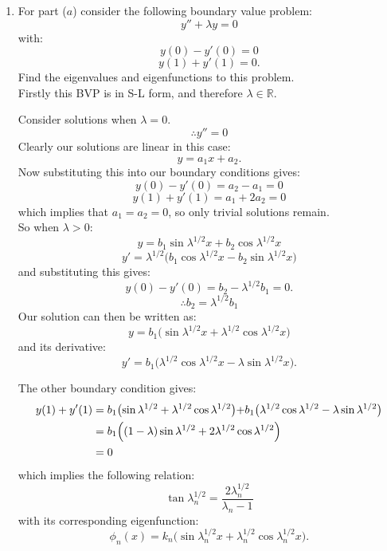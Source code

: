 \pagestyle{fancy}
\fancyhead{}

\begin{enumerate}
    \item For part ($a$) consider the following boundary value problem:
    $$y''+\lambda y=0$$
    with:
    $$y(0)-y'(0)=0$$
    $$y(1)+y'(1)=0.$$
    Find the eigenvalues and eigenfunctions to this problem. \\

    Firstly this BVP is in S-L form, and therefore
    $\lambda\in\mathbb{R}$.

    Consider solutions when $\lambda=0$.
    $$\therefore y''=0$$
    Clearly our solutions are linear in this case:
    $$y=a_1 x+a_2.$$
    Now substituting this into our boundary conditions gives:
    $$y(0)-y'(0)=a_2-a_1=0$$
    $$y(1)+y'(1)=a_1+2a_2=0$$
    which implies that $a_1=a_2=0$, so only trivial solutions remain. \\

    So when $\lambda>0$:
    $$y=b_1\sin\lambda^{1/2}x+b_2\cos\lambda^{1/2}x$$
    $$y'=\lambda^{1/2}\bigl(b_1\cos\lambda^{1/2}x-b_2\sin\lambda^{1/2}x\bigl)$$
    and substituting this gives:
    $$y(0)-y'(0)=b_2-\lambda^{1/2}b_1=0.$$
    $$\therefore b_2=\lambda^{1/2}b_1$$
    Our solution can then be written as:
    $$y=b_1\bigl(\sin\lambda^{1/2}x+\lambda^{1/2}\cos\lambda^{1/2}x\bigl)$$
    and its derivative:
    $$y'=b_1\bigl(\lambda^{1/2}\cos\lambda^{1/2}x-\lambda\sin\lambda^{1/2}x\bigl).$$

    \newpage

    The other boundary condition gives:
    \begin{align*}
        y(1)+y'(1)
        &=b_1\bigl(\sin\lambda^{1/2}+\lambda^{1/2}\cos\lambda^{1/2}\bigl)
        +b_1\bigl(\lambda^{1/2}\cos\lambda^{1/2}-\lambda\sin\lambda^{1/2}\bigr) \\
        &=b_1\Bigl((1-\lambda)\sin\lambda^{1/2}+2\lambda^{1/2}\cos\lambda^{1/2}\Bigr) \\
        &=0
    \end{align*}
    which implies the following relation:
    $$\tan\lambda_n^{1/2}=\frac{2\lambda_n^{1/2}}{\lambda_n-1}$$
    with its corresponding eigenfunction:
    $$\phi_n(x)=k_n\bigl(\sin\lambda_n^{1/2}x+\lambda_n^{1/2}\cos\lambda_n^{1/2}x\bigr).$$ \\


\end{enumerate}
